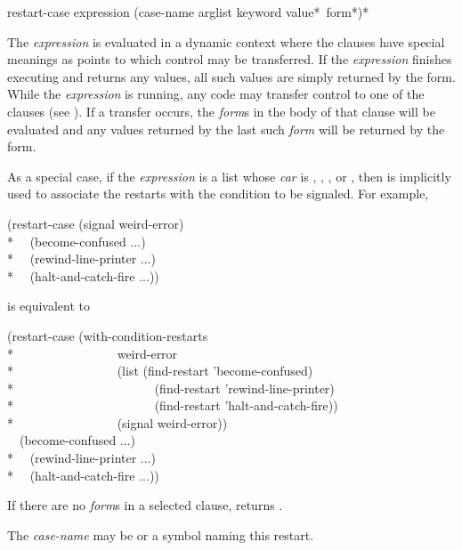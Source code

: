 \begin{defmac}
restart-case expression {(case-name arglist
                         {keyword value}*
                         {\,form}*)}*

  The \emph{expression} is evaluated in a dynamic context where the clauses have 
  special meanings as points to which control may be transferred. If the \emph{expression}
  finishes executing and returns any values, all such values are simply
  returned by the  form. While the \emph{expression} is running, any code may
  transfer control to one of the clauses (see ). If a transfer
  occurs, the \emph{form\/}s in the body of that clause will be evaluated and any values
  returned by the last such \emph{form} will be returned by the  form.

As a special case,
if the \emph{expression} is a list whose \emph{car} is , ,
     , or , then  is implicitly
     used to associate the restarts with the condition to be signaled.
For example,
\begin{lisp}
(restart-case (signal weird-error) \\*
~~(become-confused ...) \\*
~~(rewind-line-printer ...) \\*
~~(halt-and-catch-fire ...))
\end{lisp}
     is equivalent to
\begin{lisp}
(restart-case (with-condition-restarts \\*
~~~~~~~~~~~~~~~~weird-error  \\*
~~~~~~~~~~~~~~~~(list (find-restart 'become-confused)  \\*
~~~~~~~~~~~~~~~~~~~~~~(find-restart 'rewind-line-printer) \\*
~~~~~~~~~~~~~~~~~~~~~~(find-restart 'halt-and-catch-fire)) \\*
~~~~~~~~~~~~~~~~(signal weird-error)) \\
~~(become-confused ...) \\*
~~(rewind-line-printer ...) \\*
~~(halt-and-catch-fire ...))
\end{lisp}

  If there are no \emph{form\/}s in a selected clause,  returns .

  The \emph{case-name} may be  or a symbol naming this restart.


\end{defmac}
